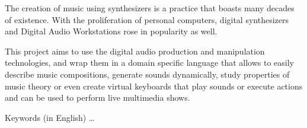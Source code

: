 The creation of music using synthesizers is a practice that boasts many decades of existence. With the proliferation of personal computers, digital synthesizers and Digital Audio Workstations rose in popularity as well.

This project aims to use the digital audio production and manipulation technologies, and wrap them in a domain specific language that allows to easily describe music compositions, generate sounds dynamically, study properties of music theory or even create virtual keyboards that play sounds or execute actions and can be used to perform live multimedia shows.
\begin{keywords}
Keywords (in English) \ldots
\end{keywords} 
